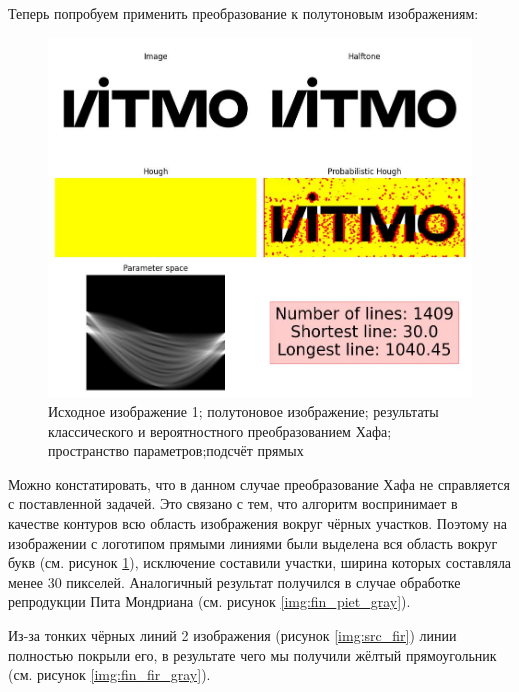 \clearpage

Теперь попробуем применить преобразование к полутоновым изображениям:

\begin{figure}[ht!]
    \centering
    \includegraphics[width=\textwidth]{images/lines/ITMO_gray.jpg}
    \caption{Исходное изображение 1; полутоновое изображение; результаты классического и вероятностного преобразованием Хафа; пространство параметров;подсчёт прямых}
    \label{img:fin_ITMO_gray}
\end{figure} 

Можно констатировать, что в данном случае преобразование Хафа не справляется с поставленной задачей. Это связано с тем, что алгоритм воспринимает в качестве контуров всю область изображения вокруг чёрных участков. Поэтому на изображении с логотипом прямыми линиями были выделена вся область вокруг букв (см. рисунок \ref*{img:fin_ITMO_gray}), исключение составили участки, ширина которых составляла менее 30 пикселей. Аналогичный результат получился в случае обработке репродукции Пита Мондриана (см. рисунок \ref*{img:fin_piet_gray}).

Из-за тонких чёрных линий 2 изображения (рисунок \ref{img:src_fir}) линии полностью покрыли его, в результате чего мы получили жёлтый прямоугольник (см. рисунок \ref*{img:fin_fir_gray}).

